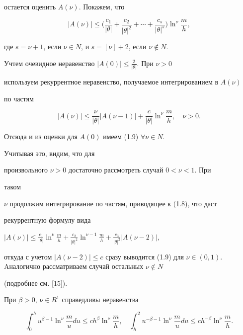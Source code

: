\begin{pf}
остается оценить $A(\nu)$. Покажем, что


\begin{equation}


|A(\nu)| \leq \bigg( \frac{c_1}{|\theta|} + \frac{c_2}{|\theta|^2} +


\dotsb + \frac{c_{s}}{|\theta|^{s}} \bigg) \ln^\nu \frac{m}{h},


\end{equation}


где $s=\nu+1$, если $\nu \in N$, и $s=[\nu]+2$, если $\nu \not\in N$.


Учтем очевидное неравенство $|A(0)| \le \frac{2}{|\theta|}$. При $\nu > 0$


используем рекуррентное неравенство, получаемое интегрированием в $A(\nu)$


по частям


\begin{equation}


|A(\nu)| \leq \frac{\nu}{|\theta|} |A(\nu-1)| + \frac{c}{|\theta|}


\ln^\nu \frac{m}{h}, \quad \nu>0.


\end{equation}


Отсюда и из оценки для $A(0)$ имеем (1.9) $\forall \nu\in N$.


Учитывая это, видим, что для


произвольного $\nu > 0$ достаточно рассмотреть случай $0 < \nu < 1$. При


таком


$\nu$ продолжим интегрирование по частям, приводящее к (1.8), что даст


рекуррентную формулу вида


$|A(\nu)| \leq \frac{c_1}{|\theta|} \ln^\nu \frac{m}{h} + \frac{c_2}


{|\theta|^2} \ln^{\nu-1} \frac{m}{h} + \frac{c_3}{|\theta|^2} |A(\nu-2)|,$


откуда с учетом $|A(\nu-2)| \le c$ сразу выводится (1.9) для $\nu\in


(0,1)$. Aналогично рассматриваем случай остальных $\nu \not\in N$


(подробнее см. [15]).


\end{pf}





\begin{notes}


При $\beta>0$, $\nu \in R^1$ справедливы неравенства


\begin{equation}


\int _0^h u^{\beta-1} \ln^\nu \frac{m}{u} du \le ch^\beta


\ln ^\nu \frac{m}{h}, \quad


\int _h^2 u^{-\beta-1} \ln^\nu \frac{m}{u} du \le ch^{-\beta}


\ln ^\nu \frac{m}{h}.


\end{equation}


\end{notes}






